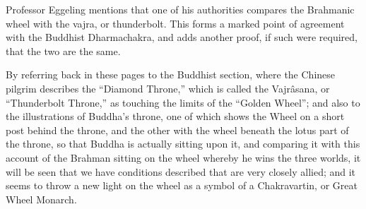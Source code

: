 \documentclass[a4paper, 11pt, oneside, polutonikogreek, english]{article}
\begin{document}
Professor Eggeling mentions that one of his authorities compares the Brahmanic wheel with the vajra, or thunderbolt. This forms a marked point of agreement with the Buddhist Dharmachakra, and adds another proof, if such were required, that the two are the same.

By referring back in these pages to the Buddhist section, where the Chinese pilgrim describes the ``Diamond Throne,'' which is called the Vajrâsana, or ``Thunderbolt Throne,'' as touching the limits of the ``Golden Wheel''; and also to the illustrations of Buddha's throne, one of which shows the Wheel on a short post behind the throne, and the other with the wheel beneath the lotus part of the throne, so that Buddha is actually sitting upon it, and comparing it with this account of the Brahman sitting on the wheel whereby he wins the three worlds, it will be seen that we have conditions described that are very closely allied; and it seems to throw a new light on the wheel as a symbol of a Chakravartin, or Great Wheel Monarch.
\end{document}
